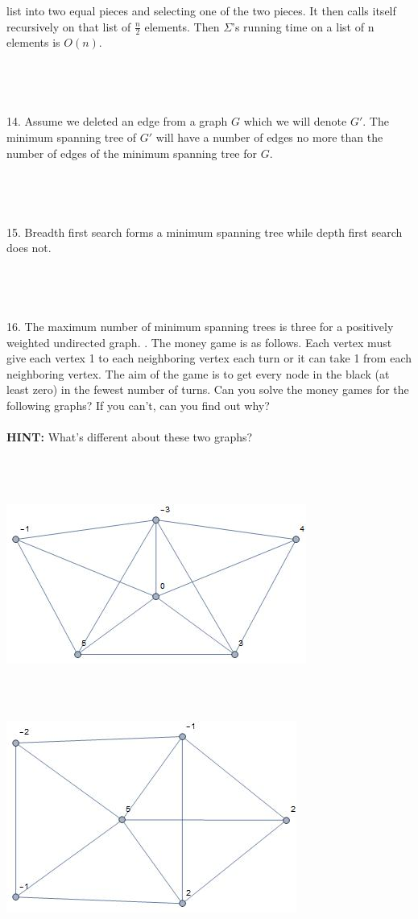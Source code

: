 \documentclass[12pt]{article}
\begin{document}
list into two equal pieces and selecting one of the two pieces. It 
then calls itself recursively on that list of $\frac{n}{2}$ elements. Then $\Sigma$'s 
running time on a list of n elements is $O(n)$.\\\\\\\\\\
14. Assume we deleted an edge from a graph $G$ which we will denote $G'$. The minimum spanning tree of $G'$ will 
have a number of edges no more than the number of edges of the minimum spanning tree for $G$.\\\\\\\\\\
15. Breadth first search forms a minimum spanning tree while depth first search does not.\\\\\\\\\\
16. The maximum number of minimum spanning trees is three for a positively weighted undirected graph.
\newpage
{}. The money game is as follows. Each vertex must give each vertex 1 to each neighboring 
vertex each turn or it can take 1 from each neighboring vertex. The aim of the game is to
get every node in the black (at least zero) in the fewest number of turns. Can you solve the money games 
for the following graphs? If you can't, can you find out why? \\\\
\textbf{HINT: } What's different about these two graphs?\\\\\\\\
\centerline{\includegraphics[scale = .8]{graph1.jpg}}\\\\
\centerline{\includegraphics[scale = .8]{graph2.jpg}}
\end{document}

